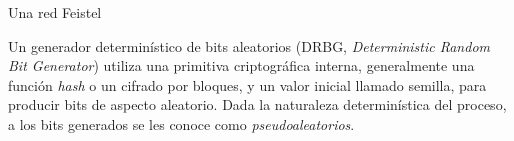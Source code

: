 Una red Feistel




Un generador determinístico de bits aleatorios (DRBG, \textit{Deterministic
Random Bit Generator}) utiliza una primitiva criptográfica interna,
generalmente una función \textit{hash} o un cifrado por bloques, y un valor
inicial llamado semilla, para producir bits de aspecto aleatorio. Dada la
naturaleza determinística del proceso, a los bits generados se les conoce como
\textit{pseudoaleatorios}.



